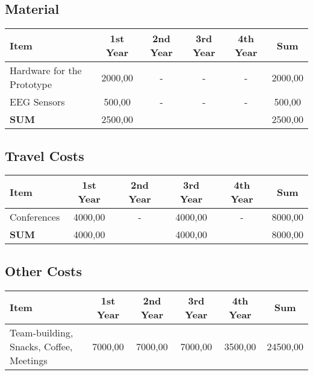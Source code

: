 \subsection{Material}
\begin{tabular}{|l|c|c|c|c|c|}
\hline 
Item & 1st Year & 2nd Year & 3rd Year & 4th Year & Sum \\ 
\hline 
Hardware for the Prototype & 2000,00 & - & - & - & 2000,00 \\ 
\hline 
EEG Sensors & 500,00 & - & - & - & 500,00 \\ 
\hline 
\textbf{SUM} & 2500,00 &  &  &  & 2500,00 \\ 
\hline 
\end{tabular} 

\subsection{Travel Costs}
\begin{tabular}{|l|c|c|c|c|c|}
\hline 
Item & 1st Year & 2nd Year & 3rd Year & 4th Year & Sum \\ 
\hline 
Conferences & 4000,00 & - & 4000,00 & - & 8000,00 \\ 
\hline 
\textbf{SUM} & 4000,00 &  & 4000,00 &  & 8000,00 \\ 
\hline 
\end{tabular} 

\subsection{Other Costs}
\begin{tabular}{|l|c|c|c|c|c|}
\hline 
Item & 1st Year & 2nd Year & 3rd Year & 4th Year & Sum \\ 
\hline 
Team-building, Snacks, Coffee, Meetings & 7000,00 & 7000,00 & 7000,00 & 3500,00 & 24500,00 \\
\hline 
\end{tabular} 

